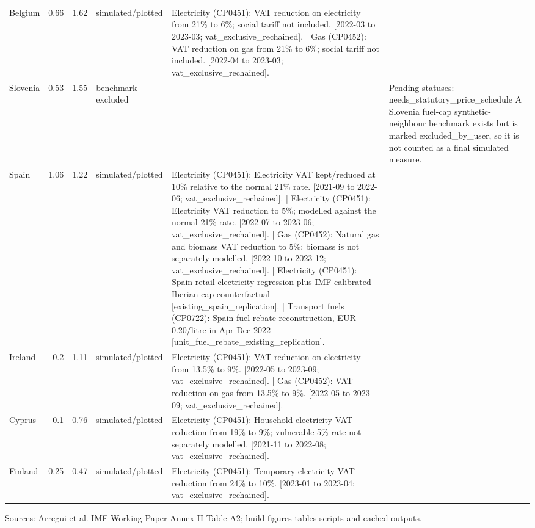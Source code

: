 \begin{table}[H]
\begin{tabular}{lrrp{}p{}p{}}
Belgium & 0.66 & 1.62 & simulated/plotted & Electricity (CP0451): VAT reduction on electricity from 21\% to 6\%; social tariff not included. [2022-03 to 2023-03; vat\_exclusive\_rechained]. | Gas (CP0452): VAT reduction on gas from 21\% to 6\%; social tariff not included. [2022-04 to 2023-03; vat\_exclusive\_rechained]. &  \\
Slovenia & 0.53 & 1.55 & benchmark excluded &  & Pending statuses: needs\_statutory\_price\_schedule A Slovenia fuel-cap synthetic-neighbour benchmark exists but is marked excluded\_by\_user, so it is not counted as a final simulated measure. \\
Spain & 1.06 & 1.22 & simulated/plotted & Electricity (CP0451): Electricity VAT kept/reduced at 10\% relative to the normal 21\% rate. [2021-09 to 2022-06; vat\_exclusive\_rechained]. | Electricity (CP0451): Electricity VAT reduction to 5\%; modelled against the normal 21\% rate. [2022-07 to 2023-06; vat\_exclusive\_rechained]. | Gas (CP0452): Natural gas and biomass VAT reduction to 5\%; biomass is not separately modelled. [2022-10 to 2023-12; vat\_exclusive\_rechained]. | Electricity (CP0451): Spain retail electricity regression plus IMF-calibrated Iberian cap counterfactual [existing\_spain\_replication]. | Transport fuels (CP0722): Spain fuel rebate reconstruction, EUR 0.20/litre in Apr-Dec 2022 [unit\_fuel\_rebate\_existing\_replication]. &  \\
Ireland & 0.2 & 1.11 & simulated/plotted & Electricity (CP0451): VAT reduction on electricity from 13.5\% to 9\%. [2022-05 to 2023-09; vat\_exclusive\_rechained]. | Gas (CP0452): VAT reduction on gas from 13.5\% to 9\%. [2022-05 to 2023-09; vat\_exclusive\_rechained]. &  \\
Cyprus & 0.1 & 0.76 & simulated/plotted & Electricity (CP0451): Household electricity VAT reduction from 19\% to 9\%; vulnerable 5\% rate not separately modelled. [2021-11 to 2022-08; vat\_exclusive\_rechained]. &  \\
Finland & 0.25 & 0.47 & simulated/plotted & Electricity (CP0451): Temporary electricity VAT reduction from 24\% to 10\%. [2023-01 to 2023-04; vat\_exclusive\_rechained]. &  \\
\bottomrule
\end{tabular}
\par\vspace{0.35em}\footnotesize\noindent Sources: Arregui et al. IMF Working Paper Annex II Table A2; build-figures-tables scripts and cached outputs.
\end{table}
